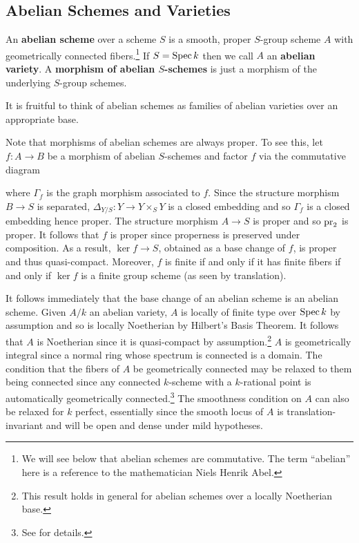 \documentclass[11pt]{article}
\begin{document}
\subsection{Abelian Schemes and Varieties}
\begin{definition}
An \textbf{abelian scheme} over a scheme $S$ is a smooth, proper $S$-group scheme $A$ with geometrically connected fibers.\footnote{We will see below that abelian schemes are commutative. The term ``abelian'' here is a reference to the mathematician Niels Henrik Abel.} If $S=\operatorname{Spec} k$ then we call $A$ an \textbf{abelian variety}. A \textbf{morphism of abelian $S$-schemes} is just a morphism of the underlying $S$-group schemes.
\end{definition}

It is fruitful to think of abelian schemes as families of abelian varieties over an appropriate base.

\begin{remark}
Note that morphisms of abelian schemes are always proper. To see this, let $f: A\to B$ be a morphism of abelian $S$-schemes and factor $f$ via the commutative diagram
\begin{center}
\end{center}
where $\Gamma_f$ is the graph morphism associated to $f$. Since the structure morphism $B\to S$ is separated, $\Delta_{Y/S}: Y\to Y\times_SY$ is a closed embedding and so $\Gamma_f$ is a closed embedding hence proper. The structure morphism $A\to S$ is proper and so $\operatorname{pr}_2$ is proper. It follows that $f$ is proper since properness is preserved under composition. As a result, $\ker f\to S$, obtained as a base change of $f$, is proper and thus quasi-compact. Moreover, $f$ is finite if and only if it has finite fibers if and only if $\ker f$ is a finite group scheme (as seen by translation).
\end{remark}

It follows immediately that the base change of an abelian scheme is an abelian scheme. Given $A/k$ an abelian variety, $A$ is locally of finite type over $\operatorname{Spec} k$ by assumption and so is locally Noetherian by Hilbert's Basis Theorem. It follows that $A$ is Noetherian since it is quasi-compact by assumption.\footnote{This result holds in general for abelian schemes over a locally Noetherian base.} $A$ is geometrically integral since a normal ring whose spectrum is connected is a domain. The condition that the fibers of $A$ be geometrically connected may be relaxed to them being connected since any connected $k$-scheme with a $k$-rational point is automatically geometrically connected.\footnote{See \cite[\textrm{Tag 0361}]{Stack} for details.} The smoothness condition on $A$ can also be relaxed for $k$ perfect, essentially since the smooth locus of $A$ is translation-invariant and will be open and dense under mild hypotheses.
\end{document}
